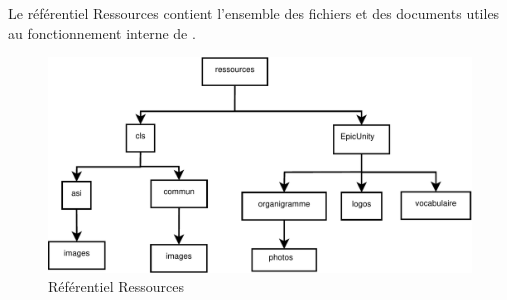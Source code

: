 Le référentiel Ressources contient l'ensemble des fichiers et des documents utiles au fonctionnement interne de \nomEquipe{}.

\begin{figure}[ht]
         \begin{center}
         \includegraphics[scale=0.78]{images/arboRessources}
         \end{center}
         \caption{Référentiel Ressources}
 \end{figure}
